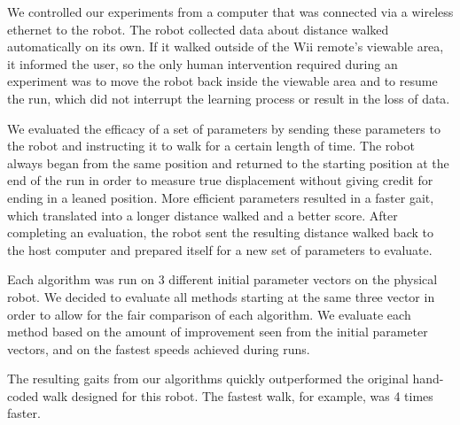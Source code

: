 We controlled our experiments from a computer that was connected via a
wireless ethernet to the robot. The robot collected data about
distance walked automatically on its own. If it walked outside of the
Wii remote's viewable area, it informed the user, so the only human
intervention required during an experiment was to move the robot back
inside the viewable area and to resume the run, which did not
interrupt the learning process or result in the loss of data.

We evaluated the efficacy of a set of parameters by sending these
parameters to the robot and instructing it to walk for a certain
length of time. The robot always began from the same position and
returned to the starting position at the end of the run in order to
measure true displacement without giving credit for ending in a leaned
position. More efficient parameters resulted in a faster gait, which
translated into a longer distance walked and a better score. After completing
an evaluation, the robot sent the resulting distance walked back to the
host computer and prepared itself for a new set of parameters to evaluate.

Each algorithm was run on 3 different initial parameter vectors on the
physical robot. We decided to evaluate all methods starting at the
same three vector in order to allow for the fair comparison of each
algorithm.  We evaluate each method based on the amount of improvement
seen from the initial parameter vectors, and on the fastest speeds
achieved during runs.

The resulting gaits from our algorithms quickly outperformed the original
hand-coded walk designed for this robot. The fastest walk, for example, was
4 times faster.
